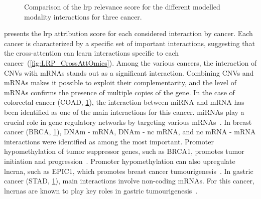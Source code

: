 \documentclass[../main.tex]{subfiles}
\begin{document}
\begin{figure}
        \caption{Comparison of the \gls{lrp} relevance score for the different modelled modality interactions for three cancer.}\label{fig:LRP_CrossAttOmics_subset}
    \end{figure}
     presents the \gls{lrp} attribution score for each considered interaction by cancer.
     Each cancer is characterized by a specific set of important interactions, suggesting that the cross-attention can learn interactions specific to each cancer~(\cref{fig:LRP_CrossAttOmics}).
     Among the various cancers, the interaction of CNVs with mRNAs stands out as a significant interaction.
     Combining CNVs and mRNAs makes it possible to exploit their complementarity, and the level of mRNAs confirms the presence of multiple copies of the gene.
     In the case of colorectal cancer (COAD, \cref{fig:LRP_CrossAttOmics_subset}),  the interaction between miRNA and mRNA has been identified as one of the main interactions for this cancer.
     miRNAs play a crucial role in gene regulatory networks by targeting various mRNAs~\cite{Amirkhah2015}.
     In breast cancer (BRCA, \cref{fig:LRP_CrossAttOmics_subset}), DNAm - mRNA, DNAm - nc mRNA, and nc mRNA - mRNA interactions were identified as among the most important.
     Promoter hypomethylation of tumor suppressor genes, such as BRCA1, promotes tumor initiation and progression~\cite{Szyf2004}.
     Promoter hypomethylation can also upregulate \gls{lncrna}, such as EPIC1, which promotes breast cancer tumourigenesis~\cite{Wang2018}.
     In gastric cancer (STAD, \cref{fig:LRP_CrossAttOmics_subset}), main interactions involve non-coding mRNAs.
     For this cancer, \glspl{lncrna} are known to play key roles in gastric tumourigenesis~\cite{Tan2020}.
\end{document}

